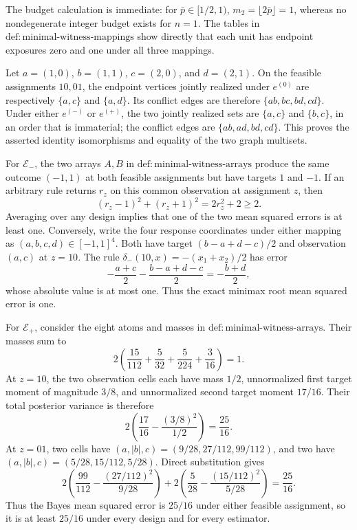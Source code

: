 The budget calculation is immediate: for \(\bar p\in[1/2,1)\), \(m_2=\lfloor2\bar p\rfloor=1\), whereas no nondegenerate integer budget exists for \(n=1\).  The tables in \(\mathrm{def{:}minimal\text{-}witness\text{-}mappings}\) show directly that each unit has endpoint exposures zero and one under all three mappings.

Let \(a=(1,0)\), \(b=(1,1)\), \(c=(2,0)\), and \(d=(2,1)\).  On the feasible assignments \(10,01\), the endpoint vertices jointly realized under \(e^{(0)}\) are respectively \(\{a,c\}\) and \(\{a,d\}\).  Its conflict edges are therefore \(\{ab,bc,bd,cd\}\).  Under either \(e^{(-)}\) or \(e^{(+)}\), the two jointly realized sets are \(\{a,c\}\) and \(\{b,c\}\), in an order that is immaterial; the conflict edges are \(\{ab,ad,bd,cd\}\).  This proves the asserted identity isomorphisms and equality of the two graph multisets.

For \(\mathcal E_-\), the two arrays \(A,B\) in \(\mathrm{def{:}minimal\text{-}witness\text{-}arrays}\) produce the same outcome \((-1,1)\) at both feasible assignments but have targets \(1\) and \(-1\).  If an arbitrary rule returns \(r_z\) on this common observation at assignment \(z\), then
\[
 (r_z-1)^2+(r_z+1)^2=2r_z^2+2\ge2.
\]
Averaging over any design implies that one of the two mean squared errors is at least one.  Conversely, write the four response coordinates under either mapping as \((a,b,c,d)\in[-1,1]^4\).  Both have target \((b-a+d-c)/2\) and observation \((a,c)\) at \(z=10\).  The rule \(\delta_-(10,x)=-(x_1+x_2)/2\) has error
\[
 -\frac{a+c}{2}-\frac{b-a+d-c}{2}=-\frac{b+d}{2},
\]
whose absolute value is at most one.  Thus the exact minimax root mean squared error is one.

For \(\mathcal E_+\), consider the eight atoms and masses in \(\mathrm{def{:}minimal\text{-}witness\text{-}arrays}\).  Their masses sum to
\[
 2\left(\frac{15}{112}+\frac5{32}+\frac5{224}+\frac3{16}\right)=1.
\]
At \(z=10\), the two observation cells each have mass \(1/2\), unnormalized first target moment of magnitude \(3/8\), and unnormalized second target moment \(17/16\).  Their total posterior variance is therefore
\[
 2\left(\frac{17}{16}-\frac{(3/8)^2}{1/2}\right)=\frac{25}{16}.
\]
At \(z=01\), two cells have \((a,|b|,c)=(9/28,27/112,99/112)\), and two have \((a,|b|,c)=(5/28,15/112,5/28)\).  Direct substitution gives
\[
 2\left(\frac{99}{112}-\frac{(27/112)^2}{9/28}\right)
 +2\left(\frac5{28}-\frac{(15/112)^2}{5/28}\right)
 =\frac{25}{16}.
\]
Thus the Bayes mean squared error is \(25/16\) under either feasible assignment, so it is at least \(25/16\) under every design and for every estimator.

